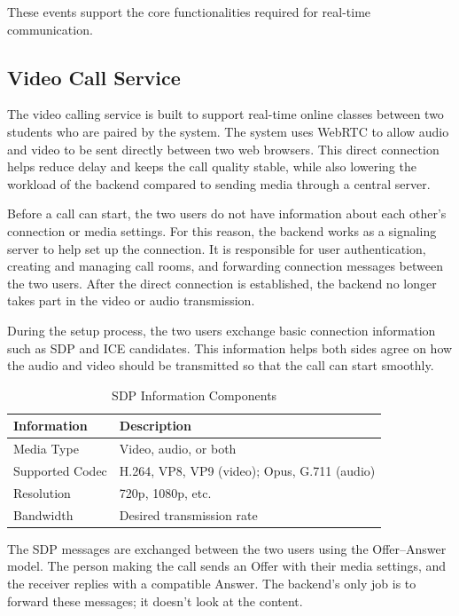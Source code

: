 \documentclass[a4paper,12pt]{report}
\begin{document}
These events support the core functionalities required for real-time communication.

\subsection{Video Call Service}

The video calling service is built to support real-time online classes between two students who are paired by the system. The system uses WebRTC to allow audio and video to be sent directly between two web browsers. This direct connection helps reduce delay and keeps the call quality stable, while also lowering the workload of the backend compared to sending media through a central server.

Before a call can start, the two users do not have information about each other’s connection or media settings. For this reason, the backend works as a signaling server to help set up the connection. It is responsible for user authentication, creating and managing call rooms, and forwarding connection messages between the two users. After the direct connection is established, the backend no longer takes part in the video or audio transmission.

During the setup process, the two users exchange basic connection information such as SDP and ICE candidates. This information helps both sides agree on how the audio and video should be transmitted so that the call can start smoothly.

\begin{table}[H]
\centering
\begin{tabular}{|p{3cm}|p{10cm}|}
\hline
\textbf{Information} & \textbf{Description} \\
\hline
Media Type & Video, audio, or both \\
\hline
Supported Codec & H.264, VP8, VP9 (video); Opus, G.711 (audio) \\
\hline
Resolution & 720p, 1080p, etc. \\
\hline
Bandwidth & Desired transmission rate \\
\hline
\end{tabular}
\caption{SDP Information Components}
\label{tab:sdp_info}
\end{table}

The SDP messages are exchanged between the two users using the Offer–Answer model. The person making the call sends an Offer with their media settings, and the receiver replies with a compatible Answer. The backend's only job is to forward these messages; it doesn't look at the content.
\end{document}

